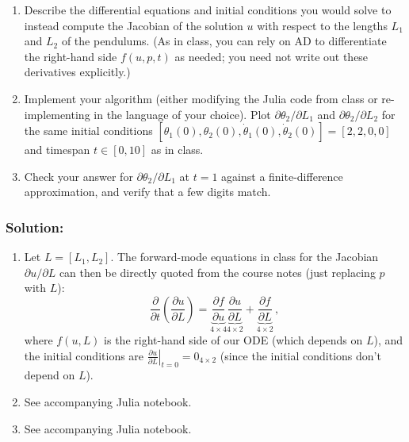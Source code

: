 \documentclass[10pt,oneside]{article}
\begin{document}
\begin{enumerate}
    
    \item  Describe the differential equations and initial conditions you would solve to instead compute the Jacobian of the solution $u$ with respect to the lengths $L_1$ and $L_2$ of the pendulums.  (As in class, you can rely on AD to differentiate the right-hand side $f(u,p,t)$ as needed; you need not write out these derivatives explicitly.)
    
    \item Implement your algorithm (either modifying the Julia code from class or re-implementing in the language of your choice).  Plot $\partial \theta_2 /\partial L_1$ and $\partial \theta_2 /\partial L_2$ for the same initial conditions $[\theta_1(0), \theta_2(0), \dot{\theta}_1(0), \dot{\theta}_2(0)] = [2,2,0,0]$ and timespan $t \in [0,10]$ as in class.

    \item Check your answer for $\partial \theta_2 /\partial L_1$ at $t = 1$ against a finite-difference approximation, and verify that a few digits match.
    
\end{enumerate}

\subsubsection*{Solution:}
\begin{enumerate}
\item Let $L = [L_1, L_2]$.  The forward-mode equations in class for the Jacobian $\partial u / \partial L$ can then be directly quoted from the course notes (just replacing $p$ with $L$):
    $$
    \boxed{\frac{\partial}{\partial t} \left(\frac{\partial u}{\partial L} \right) = \underbrace{\frac{\partial f}{\partial u}}_{4\times 4} \underbrace{\frac{\partial u}{\partial L}}_{4\times 2} + \underbrace{\frac{\partial f}{\partial L}}_{4\times 2}} \, ,
    $$
    where $f(u,L)$ is the right-hand side of our ODE (which depends on $L$), and the initial conditions are $\boxed{\left. \frac{\partial u}{\partial L} \right|_{t=0} = 0_{4\times 2}}$ (since the initial conditions don't depend on $L$).

\item See accompanying Julia notebook.

\item See accompanying Julia notebook.
\end{enumerate}
\end{document}
